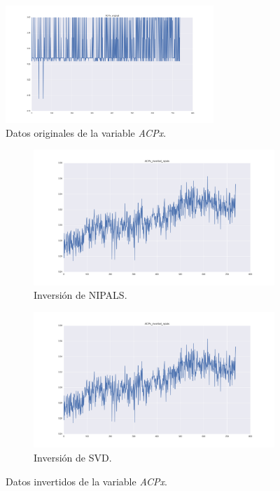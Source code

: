 \documentclass[11pt,spanish,listoffigures,listoftables]{tfgetsinf}
\begin{document}
    \begin{figure}[h]
        \centering
        \includegraphics[width=0.7\textwidth]{ACPx_original.png}
        \caption{Datos originales de la variable {\em ACPx}.}
        \label{fig:ACPx_original}
    \end{figure}

    \begin{figure}[h]
        \centering
        \begin{subfigure}[h]{0.49\textwidth}
            \centering
            \includegraphics[width=\textwidth]{ACPx_inverted_nipals.png}
            \caption{Inversión de NIPALS.}
            \label{fig:ACPx_inverted_nipals}
        \end{subfigure}
        \begin{subfigure}[h]{0.49\textwidth}
            \centering
            \includegraphics[width=\textwidth]{ACPx_inverted_nipals.png}
            \caption{Inversión de SVD.}
            \label{fig:ACPx_inverted_svd}
        \end{subfigure}
        \caption{Datos invertidos de la variable {\em ACPx}.}
        \label{fig:ACPx_inverted}
    \end{figure}
    
\end{document}
